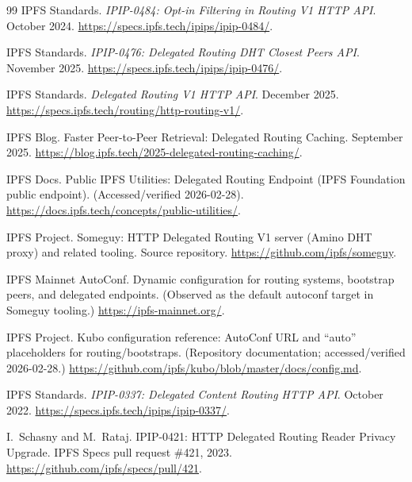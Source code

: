 \documentclass[11pt]{article}
\begin{document}
\begin{thebibliography}{99}
IPFS Standards.
\newblock \emph{IPIP-0484: Opt-in Filtering in Routing V1 HTTP API}.
 October 2024.
\newblock \url{https://specs.ipfs.tech/ipips/ipip-0484/}.

IPFS Standards.
\newblock \emph{IPIP-0476: Delegated Routing DHT Closest Peers API}.
 November 2025.
\newblock \url{https://specs.ipfs.tech/ipips/ipip-0476/}.

IPFS Standards.
\newblock \emph{Delegated Routing V1 HTTP API}.
 December 2025.
\newblock \url{https://specs.ipfs.tech/routing/http-routing-v1/}.

IPFS Blog.
\newblock Faster Peer-to-Peer Retrieval: Delegated Routing Caching.
 September 2025.
\newblock \url{https://blog.ipfs.tech/2025-delegated-routing-caching/}.

IPFS Docs.
\newblock Public IPFS Utilities: Delegated Routing Endpoint (IPFS Foundation public endpoint).
\newblock (Accessed/verified 2026-02-28).
\newblock \url{https://docs.ipfs.tech/concepts/public-utilities/}.

IPFS Project.
\newblock Someguy: HTTP Delegated Routing V1 server (Amino DHT proxy) and related tooling.
\newblock Source repository.
\newblock \url{https://github.com/ipfs/someguy}.

IPFS Mainnet AutoConf.
\newblock Dynamic configuration for routing systems, bootstrap peers, and delegated endpoints.
\newblock (Observed as the default autoconf target in Someguy tooling.)
\newblock \url{https://ipfs-mainnet.org/}.

IPFS Project.
\newblock Kubo configuration reference: AutoConf URL and ``auto'' placeholders for routing/bootstraps.
\newblock (Repository documentation; accessed/verified 2026-02-28.)
\newblock \url{https://github.com/ipfs/kubo/blob/master/docs/config.md}.

IPFS Standards.
\newblock \emph{IPIP-0337: Delegated Content Routing HTTP API}.
 October 2022.
\newblock \url{https://specs.ipfs.tech/ipips/ipip-0337/}.

I.~Schasny and M.~Rataj.
\newblock IPIP-0421: HTTP Delegated Routing Reader Privacy Upgrade.
\newblock IPFS Specs pull request \#421, 2023.
\newblock \url{https://github.com/ipfs/specs/pull/421}.


\end{thebibliography}
\end{document}
